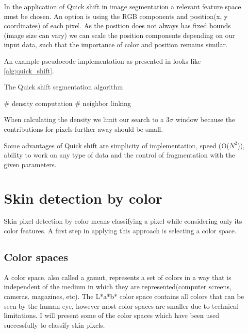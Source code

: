 \documentclass[12pt]{report}
\begin{document}
	In the application of Quick shift in image segmentation a relevant feature space must be chosen. An option is using the RGB components and position(x, y coordinates) of each pixel. As the position does not always has fixed bounds (image size can vary) we can scale the position components depending on our input data, such that the importance of color and position remains similar\cite{quickshift_gpu}.
	
	An example pseudocode implementation as presented in \cite{quickshift_gpu} looks like \ref{alg:quick_shift}.
	\begin{algorithm}
		\caption{The Quick shift segmentation algorithm}
		\label{alg:quick_shift}
		\# density computation\;
		\# neighbor linking\;
	\end{algorithm}
	When calculating the density we limit our search to a 3$\sigma$ window because the contributions for pixels further away should be small\cite{quickshift_gpu}.
	
	Some advantages of Quick shift are simplicity of implementation, speed (O($N^2$)), ability to work on any type of data and the control of fragmentation with the given parameters\cite{mode_seeking}. 
	
	\newpage
	\section{Skin detection by color}
	Skin pixel detection by color means classifying a pixel while considering only its color features. A first step in applying this approach is selecting a color space.
	
	\subsection{Color spaces}
	A color space, also called a gamut, represents a set of colors in a way that is independent of the medium in which they are represented(computer screens, cameras, magazines, etc)\cite{color_management_guide}. The L*a*b* color space contains all colors that can be seen by the human eye, however most color spaces are smaller due to technical limitations. I will present some of the color spaces which have been used successfully to classify skin pixels. 
	
\end{document}
